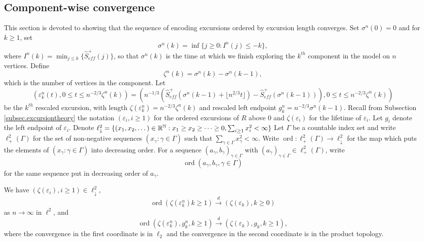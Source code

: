 


\subsection{Component-wise convergence}
This section is devoted to showing that the sequence of encoding excursions ordered by excursion length converges. Set $\sigma^n(0)=0$ and for $k\geq 1$, set
$$\sigma^n(k)=\inf\{j\geq 0: I^n(j)\leq -k\},$$
where $I^n(k)=\min_{j\leq k}\{\hat{S}^+_{eff}(j)\}$, so that $\sigma^n(k)$ is the time at which we finish exploring the $k^{th}$ component in the model on $n$ vertices. Define
$$\zeta^n(k)=\sigma^n(k)-\sigma^n(k-1),$$
which is the number of vertices in the component. Let $$(\varepsilon^n_k(t), 0\leq t \leq n^{-2/3}\zeta^n(k))=\left(n^{-1/3}\left(\hat{S}^+_{eff}(\sigma^n(k-1)+\lfloor n^{2/3}t\rfloor )-\hat{S}^+_{eff}(\sigma^n(k-1))\right), 0\leq t \leq n^{-2/3}\zeta^n(k)\right)$$
be the $k^{th}$ rescaled excursion, with length $\zeta(\varepsilon_k^n)=n^{-2/3}\zeta^n(k)$ and rescaled left endpoint $g_k^n=n^{-2/3}\sigma^n(k-1)$.  Recall from Subsection \ref{subsec.excursiontheory} the notation $(\varepsilon_i,i\geq 1)$ for the ordered excursions of $R$ above $0$ and $\zeta(\varepsilon_i)$ for the lifetime of $\varepsilon_i$. Let $g_i$ denote the left endpoint of $\varepsilon_i$. Denote $\ell_{\downarrow}^2=\{(x_1,x_2,\dots)\in {\mathbb R}^{{\mathbb N}}:x_1\geq x_2\geq\cdots\geq 0, \sum_{i\geq 1}x_i^2<\infty\}$ Let $\Gamma$ be a countable index set and write $\ell_+^2(\Gamma)$ for the set of non-negative sequences $(x_\gamma:\gamma \in \Gamma)$ such that $\sum_{\gamma\in\Gamma}x_\gamma^2<\infty$. Write $\operatorname{ord}:\ell_+^2(\Gamma)\to \ell^2_{\downarrow}$ for the map which puts the elements of $(x_\gamma :\gamma \in \Gamma)$ into decreasing order. For a sequence $(a_\gamma,b_\gamma)_{\gamma\in \Gamma}$ with $(a_\gamma)_{\gamma\in \Gamma}\in \ell^2_+(\Gamma)$, write
$$\operatorname{ord}(a_\gamma,b_\gamma,\gamma\in \Gamma)$$
for the same sequence put in decreasing order of $a_\gamma$. 
\begin{proposition}
We have $(\zeta(\varepsilon_i),i\geq 1)\in \ell^2_\downarrow$,
$$\operatorname{ord}(\zeta(\varepsilon_k^n)k\geq 1)\overset{d}{\to}(\zeta(\varepsilon_k),k\geq 0)$$
as $n\to\infty$ in $\ell^2$, and
$$\operatorname{ord}(\zeta(\varepsilon_k^n),g_k^n,k\geq 1)\overset{d}{\to}(\zeta(\varepsilon_k),g_k,k\geq 1),$$
where the convergence in the first coordinate is in $\ell_2$ and the convergence in the second coordinate is in the product topology. 
\end{proposition}
